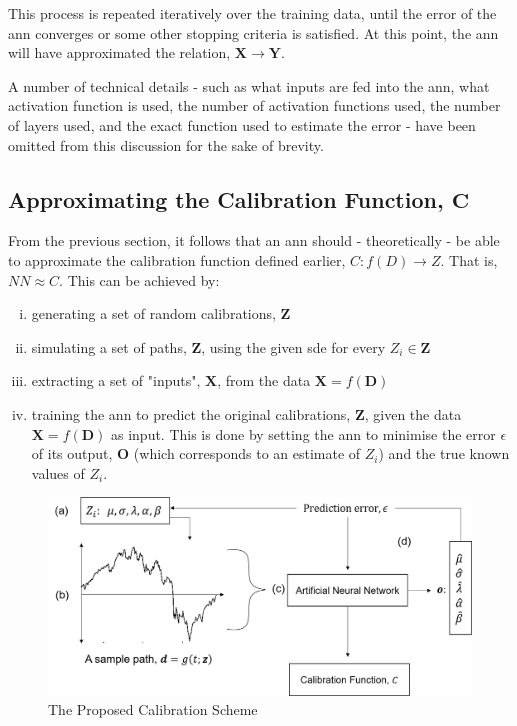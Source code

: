 \documentclass[11pt,oneside,openany,a4paper,english, report, goldenblock
]{usthesis}
\begin{document}
This process is repeated iteratively over the training data, until the error of the \acrshort{ann} converges or some other stopping criteria is satisfied. At this point, the \acrshort{ann} will have approximated the relation, $\mathbf{X}\rightarrow \mathbf{Y}$.


A number of technical details - such as what inputs are fed into the \acrshort{ann}, what activation function is used, the number of activation functions used, the number of layers used, and the exact function used to estimate the error - have been omitted from this discussion for the sake of brevity. 

\subsection{Approximating the Calibration Function, $\mathbf{C}$} \label{subsection:neural_networks:approximating_the_calibration_function_C}
From the previous section, it follows that an \acrshort{ann} should - theoretically - be able to approximate the calibration function defined earlier, $C: f \left( D \right) \rightarrow Z$. That is, $NN \approx C$.
This can be achieved by:
\begin{enumerate}[i)]
	\itemsep0em 
	
	\item generating a set of random calibrations, $\mathbf{Z}$
	
	\item simulating a set of paths,  $\mathbf{Z}$, using the given \acrshort{sde} for every  $Z_i \in \mathbf{Z}$
	
	\item extracting a set of "inputs", $\mathbf{X}$, from the data $\mathbf{X} = f\left(\mathbf{D}\right)$
	
	\item training the \acrshort{ann} to predict the original calibrations, $\mathbf{Z}$, given the data $\mathbf{X}=f \left( \mathbf{D} \right)$ as input. This is done by setting the \acrshort{ann} to minimise the error $\epsilon$ of its output, $\mathbf{O}$ (which corresponds to an estimate of $Z_i$) and the true known values of $Z_i$.
	
	
\end{enumerate}

\begin{figure}[h]
	\centering
	\includegraphics[width=1\linewidth]{Images/Diagrams/CalibrationSchemeDiagram}
	\caption[The Proposed Calibration Scheme]{The Proposed Calibration Scheme}
	\label{fig:calibrationschemediagram}
\end{figure}
\end{document}
